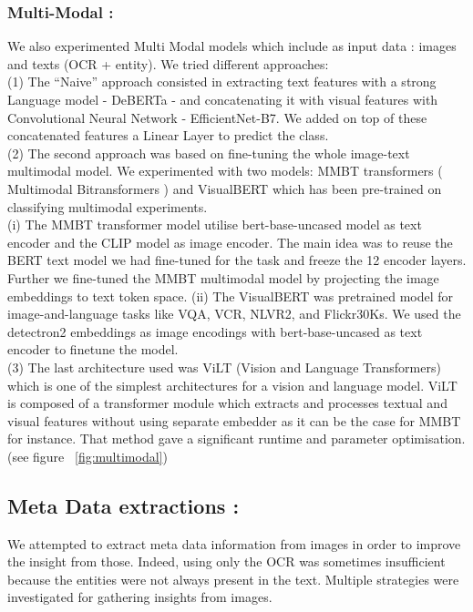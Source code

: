 \documentclass[11pt]{article}
\begin{document}
\subsubsection{Multi-Modal :}
We also experimented Multi Modal models which include as input data : images and texts (OCR + entity). 
We tried different approaches: \\
(1) The “Naive” approach consisted in extracting text features with a strong Language model - DeBERTa - and concatenating it with visual features with Convolutional Neural Network - EfficientNet-B7. We added on top of these concatenated features a Linear Layer to predict the class. \\
(2) The second approach was based on fine-tuning the whole image-text multimodal model. We experimented with two models: MMBT transformers ( Multimodal Bitransformers ) \cite{kiela2019supervised} and VisualBERT \cite{li2019visualbert} which has been pre-trained on classifying multimodal experiments.\\
(i) The MMBT transformer model utilise bert-base-uncased model as text encoder and the CLIP model \cite{https://doi.org/10.48550/arxiv.2103.00020} as image encoder. The main idea was to reuse the BERT text model we had fine-tuned for the task and freeze the 12 encoder layers. Further we fine-tuned the MMBT multimodal model by projecting the image embeddings to text token space. (ii) The VisualBERT was pretrained model \cite{li2019visualbert} for image-and-language tasks like VQA, VCR, NLVR2, and Flickr30Ks. We used the detectron2 embeddings \cite{ren2015faster} as image encodings with bert-base-uncased as text encoder to finetune the model. \\
(3) The last architecture used was ViLT \cite{kim2021vilt} (Vision and Language Transformers) which is one of the simplest architectures for a vision and language model.  ViLT is composed of a transformer module which extracts and processes textual and visual features without using separate embedder as it can be the case for MMBT for instance. That method gave a significant runtime and parameter optimisation. (see figure ~\ref{fig:multimodal})
\subsection{Meta Data extractions :}
We attempted to extract meta data information from images in order to improve the insight from those. Indeed, using only the OCR was sometimes insufficient because the entities were not always present in the text. Multiple strategies were investigated for gathering insights from images. 
\end{document}
